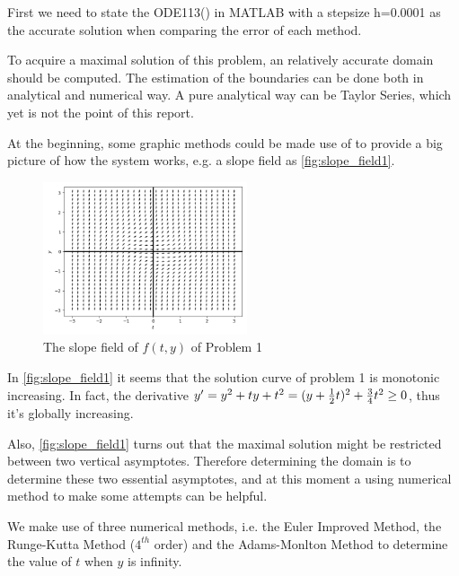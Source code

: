 \documentclass[a4paper]{article}
\begin{document}
	First we need to state the ODE113() in MATLAB with a stepsize h=0.0001 as the accurate solution when comparing the error of each method.
	
	To acquire a maximal solution of this problem, an relatively accurate domain should be computed. The estimation of the boundaries can be done both in analytical and numerical way. A pure analytical way can be Taylor Series, which yet is not the point of this report.
	
	At the beginning, some graphic methods could be made use of to provide a big picture of how the system works, e.g. a slope field as \autoref{fig:slope_field1}.
	
	\begin{figure}[H]
		\centering
		\includegraphics[width=6cm]{img/slope_field1.png}
		\caption{\label{fig:slope_field1} The slope field of $f(t, y)$ of Problem 1}
	\end{figure}
	
	In \autoref{fig:slope_field1} it seems that the solution curve of problem 1 is monotonic increasing. In fact, the derivative $y' = y^2 + ty + t^2 = (y + {1 \over 2}t)^2 + {3 \over 4}t^2 \geq 0$, thus it's globally increasing.
	
    Also, \autoref{fig:slope_field1} turns out that the maximal solution might be restricted between two vertical asymptotes. Therefore determining the domain is to determine these two essential asymptotes, and at this moment a using numerical method to make some attempts can be helpful.
    
    We make use of three numerical methods, i.e. the Euler Improved Method, the Runge-Kutta Method ($4^{th}$ order) and the Adams-Monlton Method to determine the value of $t$ when $y$ is infinity.
    
\end{document}
